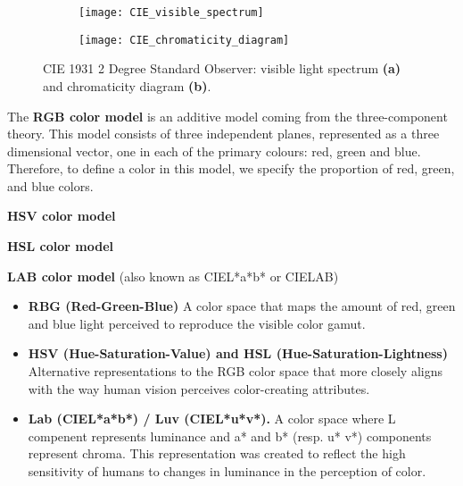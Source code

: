 \begin{figure}[!ht]
    \centering
    \begin{subfigure}[b]{0.45\textwidth}
        \texttt{[image: CIE\_visible\_spectrum]}
        \caption{}
        \label{fig:visual_spectrum}
    \end{subfigure}
    \begin{subfigure}[b]{0.45\textwidth}
        \texttt{[image: CIE\_chromaticity\_diagram]}
        \caption{}
        \label{fig:chrom_diagram}
    \end{subfigure} 
                      
    \caption{CIE 1931 2 Degree Standard Observer: visible light spectrum {\small \textsf{\textbf{(a)}}} and chromaticity diagram {\small \textsf{\textbf{(b)}}}.}\label{fig:cie_standard_observer}    
\end{figure}


The \textbf{RGB color model} is an additive model coming from the three-component theory. This model consists of three independent planes, represented as a three
dimensional vector, one in each of the primary colours: red, green and blue. Therefore, to define a color in this model, we specify the proportion of red, green, and blue colors. 

\textbf{HSV color model}

\textbf{HSL color model}

\textbf{LAB color model} (also known as CIEL*a*b* or CIELAB)


\begin{itemize}

	\item \textbf{RBG (Red-Green-Blue)} A color space that maps the amount of red, green and blue light perceived to reproduce the visible color gamut.
	\item \textbf{HSV (Hue-Saturation-Value) and HSL (Hue-Saturation-Lightness)} Alternative representations to the RGB color space that more closely aligns with the way human vision perceives color-creating attributes.
	\item \textbf{Lab (CIEL*a*b*) / Luv (CIEL*u*v*).} A color space where L compenent represents luminance and a* and b* (resp. u* v*) components represent chroma. This representation was created to reflect the high sensitivity of humans to changes in luminance in the perception of color.
\end{itemize}


